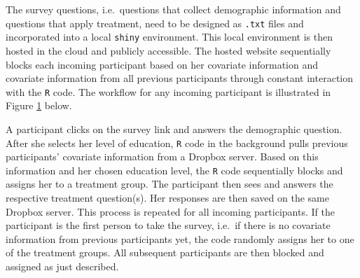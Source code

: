 \documentclass[12pt,econ]{sources/authesis}
\makeatletter
\def\caption{\refstepcounter\@captype \@dblarg{\@caption\@captype}}
\makeatother
\begin{document}
The survey questions, i.e.~questions that collect demographic information and questions that apply treatment, need to be designed as \texttt{.txt} files and incorporated into a local \texttt{shiny} environment. This local environment is then hosted in the cloud and publicly accessible. The hosted website sequentially blocks each incoming participant based on her covariate information and covariate information from all previous participants through constant interaction with the \texttt{R} code. The workflow for any incoming participant is illustrated in Figure \ref{online-workflow} below.

\vspace{0.8cm}
\begin{figure}[ht]
\centering
{}
\caption{Online survey experiment workflow} \label{online-workflow}
\end{figure}
A participant clicks on the survey link and answers the demographic question. After she selects her level of education, \texttt{R} code in the background pulls previous participants' covariate information from a Dropbox server. Based on this information and her chosen education level, the \texttt{R} code sequentially blocks and assigns her to a treatment group. The participant then sees and answers the respective treatment question(s). Her responses are then saved on the same Dropbox server. This process is repeated for all incoming participants. If the participant is the first person to take the survey, i.e.~if there is no covariate information from previous participants yet, the code randomly assigns her to one of the treatment groups. All subsequent participants are then blocked and assigned as just described.
\end{document}

